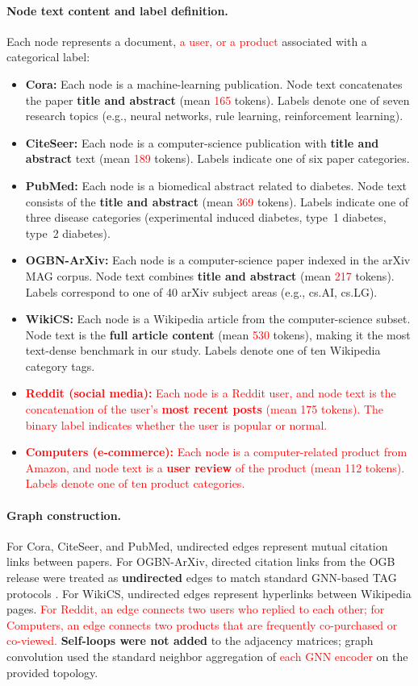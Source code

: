 \documentclass[a4paper,fleqn]{cas-sc}
\newcommand{\revone}[1]{\textcolor{red}{#1}}   %
\begin{document}
\paragraph{Node text content and label definition.}
Each node represents a document, \revone{a user, or a product} associated with a categorical label:
\begin{itemize}
    \item \textbf{Cora:} Each node is a machine-learning publication. Node text concatenates the paper \textbf{title and abstract} (mean \revone{165} tokens). Labels denote one of seven research topics (e.g., neural networks, rule learning, reinforcement learning).
    \item \textbf{CiteSeer:} Each node is a computer-science publication with \textbf{title and abstract} text (mean \revone{189} tokens). Labels indicate one of six paper categories.
    \item \textbf{PubMed:} Each node is a biomedical abstract related to diabetes. Node text consists of the \textbf{title and abstract} (mean \revone{369} tokens). Labels indicate one of three disease categories (experimental induced diabetes, type~1 diabetes, type~2 diabetes).
    \item \textbf{OGBN-ArXiv:} Each node is a computer-science paper indexed in the arXiv MAG corpus. Node text combines \textbf{title and abstract} (mean \revone{217} tokens). Labels correspond to one of 40 arXiv subject areas (e.g., cs.AI, cs.LG).
    \item \textbf{WikiCS:} Each node is a Wikipedia article from the computer-science subset. Node text is the \textbf{full article content} (mean \revone{530} tokens), making it the most text-dense benchmark in our study. Labels denote one of ten Wikipedia category tags.
    \item \revone{\textbf{Reddit (social media):} Each node is a Reddit user, and node text is the concatenation of the user's \textbf{most recent posts} (mean 175 tokens). The binary label indicates whether the user is popular or normal.}
    \item \revone{\textbf{Computers (e-commerce):} Each node is a computer-related product from Amazon, and node text is a \textbf{user review} of the product (mean 112 tokens). Labels denote one of ten product categories.}
\end{itemize}
\paragraph{Graph construction.}
For Cora, CiteSeer, and PubMed, undirected edges represent mutual citation links between papers. For OGBN-ArXiv, directed citation links from the OGB release were treated as \textbf{undirected} edges to match standard GNN-based TAG protocols \citep{Wu2025LLMNode}. For WikiCS, undirected edges represent hyperlinks between Wikipedia pages. \revone{For Reddit, an edge connects two users who replied to each other; for Computers, an edge connects two products that are frequently co-purchased or co-viewed.} \textbf{Self-loops were not added} to the adjacency matrices; graph convolution used the standard neighbor aggregation of \revone{each GNN encoder} on the provided topology.
\end{document}
